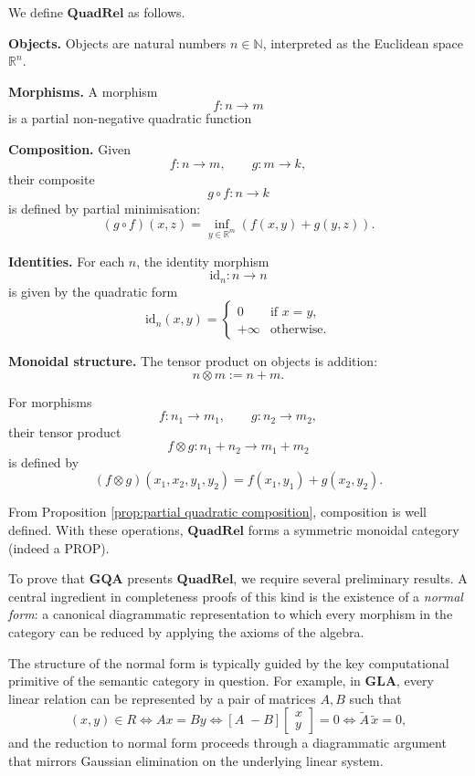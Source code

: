 \begin{definition}

We define $\mathbf{QuadRel}$ as follows.

\medskip

\noindent
\textbf{Objects.}
Objects are natural numbers $n \in \mathbb{N}$, interpreted as the
Euclidean space $\mathbb{R}^n$.

\medskip

\noindent
\textbf{Morphisms.}
A morphism
\[
f : n \to m
\]
is a partial non-negative quadratic function

\medskip

\noindent
\textbf{Composition.}
Given
\[
f : n \to m,
\qquad
g : m \to k,
\]
their composite
\[
g \circ f : n \to k
\]
is defined by partial minimisation:
\[
(g \circ f)(x,z)
=
\inf_{y \in \mathbb{R}^m}
\left(
f(x,y) + g(y,z)
\right).
\]

\medskip

\noindent
\textbf{Identities.}
For each $n$, the identity morphism
\[
\mathrm{id}_n : n \to n
\]
is given by the quadratic form
\[
\mathrm{id}_n(x,y) =
\begin{cases}
0 & \text{if } x=y, \\
+\infty & \text{otherwise}.
\end{cases}
\]

\medskip

\noindent
\textbf{Monoidal structure.}
The tensor product on objects is addition:
\[
n \otimes m := n+m.
\]

For morphisms
\[
f : n_1 \to m_1,
\qquad
g : n_2 \to m_2,
\]
their tensor product
\[
f \otimes g : n_1+n_2 \to m_1+m_2
\]
is defined by
\[
(f \otimes g)(x_1,x_2,y_1,y_2)
=
f(x_1,y_1) + g(x_2,y_2).
\]

\medskip

From Proposition \ref{prop:partial quadratic composition}, composition is well defined. With these operations, $\mathbf{QuadRel}$ forms a symmetric monoidal
category (indeed a PROP).

\end{definition}

To prove that $\mathbf{GQA}$ presents $\mathbf{QuadRel}$, we require  several preliminary results. A central ingredient in completeness proofs  of this kind is the existence of a \emph{normal form}: a canonical  diagrammatic representation to which every morphism in the category can  be reduced by applying the axioms of the algebra.

The structure of the normal form is typically guided by the key  computational primitive of the semantic category in question. For example,  in $\mathbf{GLA}$, every linear relation can be represented by a pair of  matrices $A, B$ such that
\[
(x,y) \in R
\iff
Ax = By
\iff
[A \;-B] \begin{bmatrix} x \\ y \end{bmatrix} = 0
\iff
\widetilde{A}\,\widetilde{x} = 0,
\]
and the reduction to normal form proceeds through a diagrammatic argument  that mirrors Gaussian elimination on the underlying linear system.

